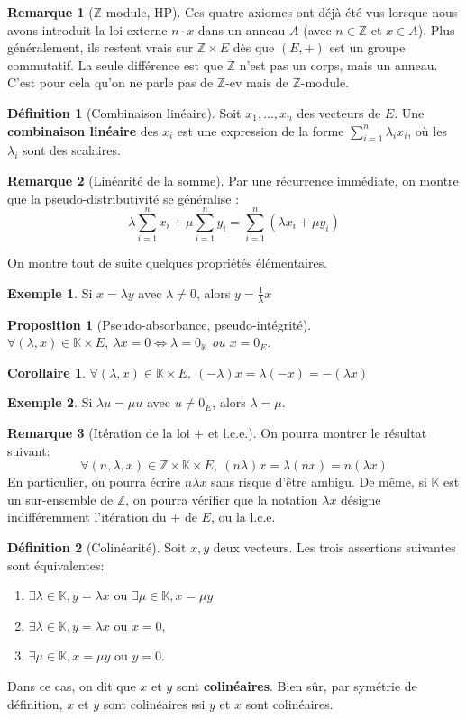 \documentclass[french]{book}
\newcommand{\Z}{\mathbb{Z}}
\theoremstyle{plain}
\newtheorem{prop}{Proposition}[chapter]
\newtheorem{cor}{Corollaire}[chapter]
\theoremstyle{definition}
\newtheorem{dfn}{Définition}[chapter]
\newtheorem{exa}{Exemple}[chapter]
\newtheorem{rmq}{Remarque}[chapter]
\theoremstyle{remark}
\begin{document}
\begin{rmq}[$\Z$-module, HP]
	Ces quatre axiomes ont déjà été vus lorsque nous avons introduit la loi externe $n \cdot x$ dans un anneau $A$ (avec $n \in \mathbb{Z}$ et $x \in A$). Plus généralement, ils restent vrais sur $\mathbb{Z} \times E$ dès que $(E, +)$ est un groupe commutatif. La seule différence est que $\mathbb{Z}$ n'est pas un corps, mais un anneau. C'est pour cela qu'on ne parle pas de $\mathbb{Z}$-ev mais de $\mathbb{Z}$-module.
\end{rmq}
\begin{dfn}[Combinaison linéaire]
	Soit $x_1, ..., x_n$ des vecteurs de $E$. Une \textbf{combinaison linéaire} des $x_i$ est une expression de la forme $\displaystyle\sum_{i=1}^{n} \lambda_i x_i$,
	où les $\lambda_i$ sont des scalaires.
\end{dfn}
\begin{rmq}[Linéarité de la somme]
	Par une récurrence immédiate, on montre que la pseudo-distributivité se généralise :$$	\lambda \sum_{i=1}^{n} x_i + \mu \sum_{i=1}^{n} y_i = \sum_{i=1}^{n} (\lambda x_i + \mu y_i)$$
\end{rmq}
On montre tout de suite quelques propriétés élémentaires.
\begin{exa}
	Si $x = \lambda y$ avec $\lambda \neq 0$, alors $\displaystyle y = \frac{1}{\lambda}x$
\end{exa}
\begin{prop}[Pseudo-absorbance, pseudo-intégrité]
	$\forall (\lambda, x) \in \mathbb{K} \times E,\ \lambda x = 0 \Leftrightarrow \lambda = 0_{\mathbb{K}}$ ou $x = 0_{E}$.
\end{prop}
\begin{cor}
	$\forall (\lambda, x) \in \mathbb{K} \times E,\ (-\lambda)x = \lambda(-x) = -(\lambda x)$
\end{cor}
\begin{exa}
	Si $\lambda u=\mu u$ avec $u\ne0_E$, alors $\lambda=\mu$.
\end{exa}
\begin{rmq}[Itération de la loi $+$ et l.c.e.]
	On pourra montrer le résultat suivant:$$	\forall (n, \lambda, x) \in \mathbb{Z} \times \mathbb{K} \times E,\	(n\lambda)x = \lambda(nx) = n(\lambda x)$$ En particulier, on pourra écrire $n\lambda x$ sans risque d'être ambigu. De même, si $\mathbb{K}$ est un sur-ensemble de $\mathbb{Z}$, on pourra vérifier que la notation $\lambda x$ désigne indifféremment l'itération du $+$ de $E$, ou la l.c.e.
\end{rmq}
\begin{dfn}[Colinéarité]
	Soit $x, y$ deux vecteurs. Les trois assertions suivantes sont équivalentes:
	\begin{enumerate}
		\item $\exists \lambda \in \mathbb{K}, y = \lambda x$ ou $\exists \mu \in \mathbb{K}, x = \mu y$
		\item $\exists \lambda \in \mathbb{K}, y = \lambda x$ ou $x = 0$,
		\item $\exists \mu \in \mathbb{K}, x = \mu y$ ou $y = 0$.
	\end{enumerate} Dans ce cas, on dit que $x$ et $y$ sont \textbf{colinéaires}. Bien sûr, par symétrie de définition, $x$ et $y$ sont colinéaires ssi $y$ et $x$ sont colinéaires.
\end{dfn}
\end{document}
